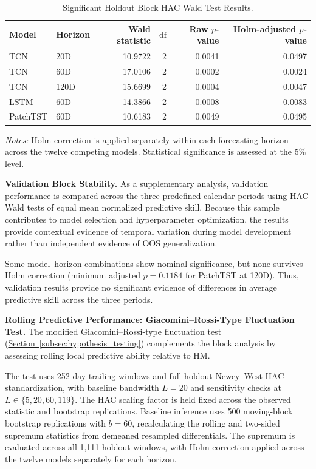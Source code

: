 \documentclass[runningheads,orivec]{llncs}
\begin{document}
\begin{table}[htbp]
\centering
\caption{Significant Holdout Block HAC Wald Test Results.}\label{tab:h3_holdout_sig}
\setlength{\tabcolsep}{4.5pt}
\begin{tabular}{llrrrr}
\hline
Model & Horizon & Wald statistic & $\mathrm{df}$ & Raw $p$-value & Holm-adjusted $p$-value \\
\hline
TCN & 20D & 10.9722 & 2 & 0.0041 & 0.0497 \\
TCN & 60D & 17.0106 & 2 & 0.0002 & 0.0024 \\
TCN & 120D & 15.6699 & 2 & 0.0004 & 0.0047 \\
LSTM & 60D & 14.3866 & 2 & 0.0008 & 0.0083 \\
PatchTST & 60D & 10.6183 & 2 & 0.0049 & 0.0495 \\
\hline
\end{tabular}
\par\vspace{4pt}\parbox{\linewidth}{\scriptsize\textit{Notes:} Holm correction is applied separately within each forecasting horizon across the twelve competing models. Statistical significance is assessed at the 5\% level.}
\end{table}

\noindent\textbf{Validation Block Stability.}
As a supplementary analysis, validation performance is compared across the three predefined calendar periods using HAC Wald tests of equal mean normalized predictive skill. Because this sample contributes to model selection and hyperparameter optimization, the results provide contextual evidence of temporal variation during model development rather than independent evidence of OOS generalization.

Some model--horizon combinations show nominal significance, but none survives Holm correction (minimum adjusted $p=0.1184$ for PatchTST at 120D). Thus, validation results provide no significant evidence of differences in average predictive skill across the three periods.

\medskip
\noindent\textbf{Rolling Predictive Performance: Giacomini--Rossi-Type Fluctuation Test.}
The modified Giacomini--Rossi-type fluctuation test (\hyperref[subsec:hypothesis_testing]{Section~\ref*{subsec:hypothesis_testing}}) complements the block analysis by assessing rolling local predictive ability relative to HM.

The test uses 252-day trailing windows and full-holdout Newey--West HAC standardization, with baseline bandwidth $L=20$ and sensitivity checks at $L\in\{5,20,60,119\}$. The HAC scaling factor is held fixed across the observed statistic and bootstrap replications. Baseline inference uses 500 moving-block bootstrap replications with $b=60$, recalculating the rolling and two-sided supremum statistics from demeaned resampled differentials. The supremum is evaluated across all 1,111 holdout windows, with Holm correction applied across the twelve models separately for each horizon.
\end{document}
